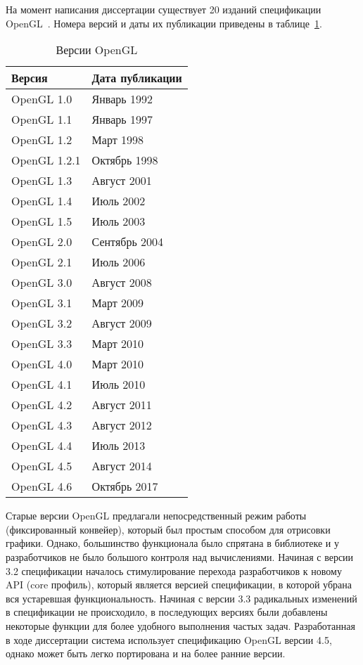 На момент написания диссертации существует 20 изданий спецификации
OpenGL~\cite{OpenGLHistory}. Номера версий и даты их публикации приведены в
таблице~\ref{table:OpenGLVersions}.
\begin{table}
\caption{Версии OpenGL}%
\label{table:OpenGLVersions}
\centering
\small
\begin{tabular}{| l | l |}
    \hline
    Версия & Дата публикации \\
    \hline
    OpenGL 1.0 & Январь 1992 \\
    OpenGL 1.1 & Январь 1997 \\
    OpenGL 1.2 & Март 1998 \\
    OpenGL 1.2.1 & Октябрь 1998 \\
    OpenGL 1.3 & Август 2001 \\
    OpenGL 1.4 & Июль 2002 \\
    OpenGL 1.5 & Июль 2003 \\
    OpenGL 2.0 & Сентябрь 2004 \\
    OpenGL 2.1 & Июль 2006 \\
    OpenGL 3.0 & Август 2008 \\
    OpenGL 3.1 & Март 2009 \\
    OpenGL 3.2 & Август 2009 \\
    OpenGL 3.3 & Март 2010 \\
    OpenGL 4.0 & Март 2010 \\
    OpenGL 4.1 & Июль 2010 \\
    OpenGL 4.2 & Август 2011 \\
    OpenGL 4.3 & Август 2012 \\
    OpenGL 4.4 & Июль 2013 \\
    OpenGL 4.5 & Август 2014 \\
    OpenGL 4.6 & Октябрь 2017 \\
    \hline
\end{tabular}
\end{table}
Старые версии OpenGL предлагали непосредственный режим работы (фиксированный
конвейер), который был простым способом для отрисовки графики.
Однако, большинство функционала было спрятана в библиотеке и у разработчиков не
было большого контроля над вычислениями. Начиная с версии 3.2 спецификации
началось стимулирование перехода разработчиков к новому API (core профиль),
который является версией спецификации, в которой убрана вся устаревшая
функциональность. Начиная с версии 3.3 радикальных изменений в спецификации не
происходило, в последующих версиях были добавлены некоторые функции для более
удобного выполнения частых задач. Разработанная в ходе диссертации система
использует спецификацию OpenGL версии 4.5, однако может быть легко портирована и
на более ранние версии.

